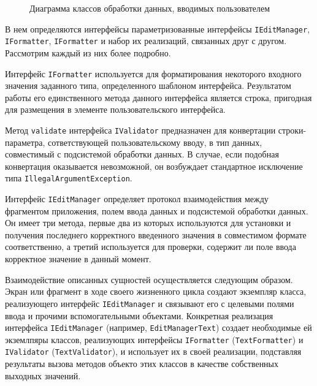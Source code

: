 \begin{figure}[h!]
  \centering
  \caption{Диаграмма классов обработки данных, вводимых пользователем}
  \label{fig:implementation_ui_edit_manager}
\end{figure}

В нем определяются интерфейсы параметризованные интерфейсы
\texttt{IEditManager}, \texttt{IFormatter}, \texttt{IFormatter}
и набор их реализаций, связанных друг с другом. Рассмотрим каждый из них более подробно.

Интерфейс \texttt{IFormatter} используется для форматирования некоторого входного
значения заданного типа, определенного шаблоном интерфейса.
Результатом работы его единственного метода данного интерфейса является строка,
пригодная для размещения в элементе пользовательского интерфейса.

Метод \texttt{validate} интерфейса \texttt{IValidator} предназначен для
конвертации строки-параметра, сответствующей пользовательскому вводу,
в тип данных, совместимый с подсистемой обработки данных. В случае,
если подобная конвертация оказывается невозможной, он возбуждает
стандартное исключение типа \texttt{IllegalArgumentException}.

Интерфейс \texttt{IEditManager} определяет протокол взаимодействия
между фрагментом приложения, полем ввода данных
и подсистемой обработки данных.
Он имеет три метода, первые два из которых используются
для установки и получения последнего корректного введенного значения
в совместимом формате соответственно, а третий используется для проверки,
содержит ли поле ввода корректное значение в данный момент.

Взаимодействие описанных сущностей осуществляется следующим образом.
Экран или фрагмент в ходе своего жизненного цикла создают экземпляр класса,
реализующего интерфейс \texttt{IEditManager} и связывают его с целевыми
полями ввода и прочими вспомогательными объектами.
Конкретная реализация интерфейса \texttt{IEditManager}
(например, \texttt{EditManagerText})
создает необходимые ей экземлпяры классов, реализующих интерфейсы
\texttt{IFormatter} (\texttt{TextFormatter})
и \texttt{IValidator} (\texttt{TextValidator}),
и использует их в своей реализации,
подставляя результаты вызова методов объекто этих классов
в качестве собственных выходных значений.

